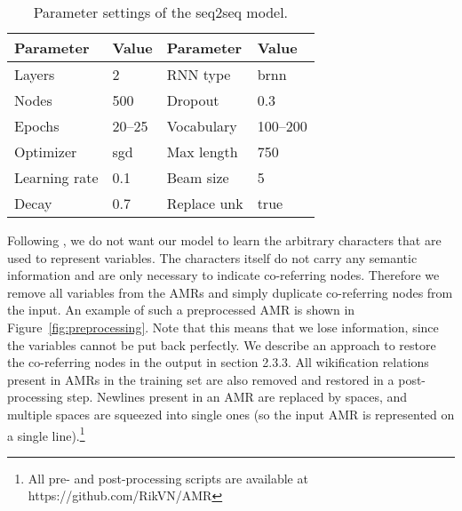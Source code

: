 \documentclass[a4paper,10pt,twoside]{article}
\begin{document}
\begin{table}[h]
\centering
\caption{Parameter settings of the seq2seq model.\label{tab:param}}
\begin{tabular}{ll|ll}
\toprule
\textbf{Parameter} & \textbf{Value} & \textbf{Parameter} & \textbf{Value} \\
\midrule
Layers             & 2              & RNN type           & brnn           \\
Nodes              & 500            & Dropout            & 0.3            \\
Epochs			   & 20--25			& Vocabulary		 & 100--200		  \\
Optimizer          & sgd        	& Max length         & 750            \\
Learning rate      & 0.1            & Beam size          & 5              \\
Decay              & 0.7            & Replace unk        & true           \\ 
\bottomrule
\end{tabular}
\end{table}

Following , we do not want our model to learn the arbitrary characters that are used to represent variables. The characters itself do not carry any semantic information and are only necessary to indicate co-referring nodes. Therefore we remove all variables from the AMRs and simply duplicate co-referring nodes from the input. An example of such a preprocessed AMR is shown in Figure~\ref{fig:preprocessing}. Note that this means that we lose information, since the variables cannot be put back perfectly. We describe an approach to restore the co-referring nodes in the output in section 2.3.3. All wikification relations present in AMRs in the training set are also removed and restored in a post-processing step. Newlines present in an AMR are replaced by spaces, and multiple spaces are squeezed into single ones (so the input AMR is represented on a single line).\footnote{All pre- and post-processing scripts are available at https://github.com/RikVN/AMR}
\end{document}
